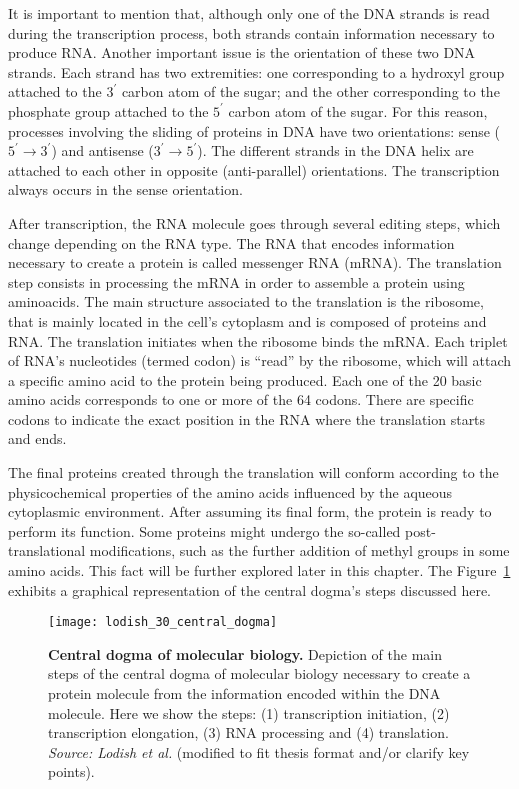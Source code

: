 It is important to mention that, although only one of the DNA strands is read during the transcription process, both strands contain information necessary to produce RNA. Another important issue is the orientation of these two DNA strands. Each strand has two extremities: one corresponding to a hydroxyl group attached to the $3^\prime$ carbon atom of the sugar; and the other corresponding to the phosphate group attached to the $5^\prime$ carbon atom of the sugar. For this reason, processes involving the sliding of proteins in DNA have two orientations: sense ($5^\prime \rightarrow 3^\prime$) and antisense ($3^\prime \rightarrow 5^\prime$). The different strands in the DNA helix are attached to each other in opposite (anti-parallel) orientations. The transcription always occurs in the sense orientation.

After transcription, the RNA molecule goes through several editing steps, which change depending on the RNA type. The RNA that encodes information necessary to create a protein is called messenger RNA (mRNA). The translation step consists in processing the mRNA in order to assemble a protein using aminoacids. The main structure associated to the translation is the ribosome, that is mainly located in the cell's cytoplasm and is composed of proteins and RNA. The translation initiates when the ribosome binds the mRNA. Each triplet of RNA's nucleotides (termed codon) is ``read'' by the ribosome, which will attach a specific amino acid to the protein being produced. Each one of the 20 basic amino acids corresponds to one or more of the 64 codons. There are specific codons to indicate the exact position in the RNA where the translation starts and ends.

The final proteins created through the translation will conform according to the physicochemical properties of the amino acids influenced by the aqueous cytoplasmic environment. After assuming its final form, the protein is ready to perform its function. Some proteins might undergo the so-called post-translational modifications, such as the further addition of methyl groups in some amino acids. This fact will be further explored later in this chapter. The Figure~\ref{fig:lodish_central_dogma} exhibits a graphical representation of the central dogma's steps discussed here.

\begin{figure}[h!]
\centering
\texttt{[image: lodish\_30\_central\_dogma]}
\caption[Central dogma of molecular biology]{\textbf{Central dogma of molecular biology.} Depiction of the main steps of the central dogma of molecular biology necessary to create a protein molecule from the information encoded within the DNA molecule. Here we show the steps: (1) transcription initiation, (2) transcription elongation, (3) RNA processing and (4) translation. \emph{Source: Lodish et al.}\cite{lodish2007} (modified to fit thesis format and/or clarify key points).}
\label{fig:lodish_central_dogma}
\end{figure}

